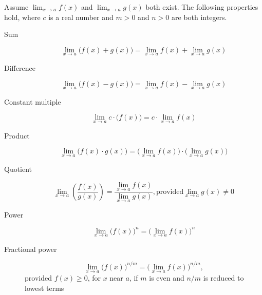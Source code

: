 \documentclass[nooutcomes]{ximera}
\begin{document}
  Assume $\lim_{x \to a} f(x)$ and $\lim_{x \to a} g(x)$ both exist.
  The following properties hold, where $c$ is a real number and $m > 0$ and $n > 0$ are both integers.
  \begin{description}
      \item[Sum]
        \[
          \lim_{x \to a} \bigl(f(x) + g(x)\bigr) = \lim_{x \to a} f(x) + \lim_{x \to a} g(x)
        \]

      \item[Difference]
        \[
          \lim_{x \to a} \bigl(f(x) - g(x)\bigr) = \lim_{x \to a} f(x) - \lim_{x \to a} g(x)
        \]

      \item[Constant multiple]
        \[
          \lim_{x \to a} c \cdot \bigl( f(x) \bigr) = c \cdot \lim_{x \to a} f(x)
        \]

      \item[Product]
        \[
          \lim_{x \to a} \bigl(f(x) \cdot g(x)\bigr) = \bigl(\lim_{x \to a} f(x)\bigr) \cdot \bigl(\lim_{x \to a} g(x) \bigr)
        \]

      \item[Quotient]
        \[
          \lim_{x \to a} \left(\frac{f(x)}{g(x)}\right) = \frac{\lim_{x \to a} f(x)}{\lim_{x \to a} g(x)}, \text{provided} \lim_{x \to a} g(x) \ne 0
        \]   

      \item[ Power]
        \[
          \lim_{x \to a} \bigl(f(x)\bigr)^n = \bigl(\lim_{x \to a} f(x)\bigr)^n
        \]

      \item[Fractional power]
        \[
          \lim_{x \to a} \bigl(f(x)\bigr)^{n/m} = \bigl(\lim_{x \to a} f(x)\bigr)^{n/m},
        \]
        provided $f(x) \ge 0$, for $x$ near $a$, if $m$ is even and $n/m$ is reduced to lowest terms
    \end{description}
\end{document}
